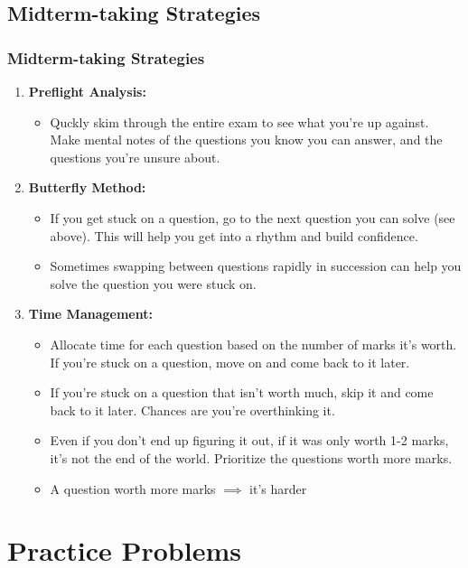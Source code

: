 \documentclass[hyperref={colorlinks,citecolor=blue,linkcolor=blue,urlcolor=blue}, aspectratio=1610]{beamer}
\begin{document}
\subsection{Midterm-taking Strategies}
\begin{frame}
  \frametitle[Midterm-taking Strategies]{Midterm-taking Strategies}
  \begin{enumerate}
    \item \textbf{Preflight Analysis:}
    \begin{itemize}
      \item Quckly skim through the entire exam to see what you're up against. Make mental notes of the questions you know you can answer, and the questions you're unsure about.
    \end{itemize}
    \pause
    \item \textbf{Butterfly Method:}
    \begin{itemize}
      \item If you get stuck on a question, go to the next question you can solve (see above). This will help you get into a rhythm and build confidence.
      \item Sometimes swapping between questions rapidly in succession can help you solve the question you were stuck on.
    \end{itemize}
    \pause
    \item \textbf{Time Management:}
    \begin{itemize}
      \item Allocate time for each question based on the number of marks it's worth. If you're stuck on a question, move on and come back to it later.
      \item If you're stuck on a question that isn't worth much, skip it and come back to it later. Chances are you're overthinking it.
      \item Even if you don't end up figuring it out, if it was only worth 1-2 marks, it's not the end of the world. Prioritize the questions worth more marks.
      \item A question worth more marks $\implies$ it's harder
    \end{itemize}
  \end{enumerate}
\end{frame}

\section{Practice Problems}
\end{document}
